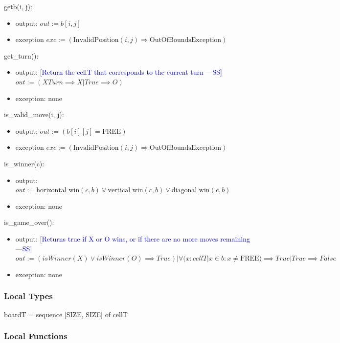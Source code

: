 \documentclass[12pt,fleqn]{examtst}
\newcommand{\authornote}[3]{\textcolor{#1}{[#3 ---#2]}}
\newcommand{\authornote}[3]{}
\newcommand{\wss}[1]{\authornote{blue}{SS}{#1}}
\begin{document}
\noindent getb(i, j):
\begin{itemize}
\item output: $\mathit{out} := b[i, j]$
\item exception
$exc := (\mbox{InvalidPosition}(i, j) \Rightarrow \mbox{OutOfBoundsException})$
\end{itemize}

\noindent get\_turn():
\begin{itemize}
\item output: \wss{Return the cellT that corresponds to the current turn}\\
$out := (XTurn \implies X | True \implies O)$

\item exception: none
\end{itemize}

\noindent is\_valid\_move(i, j):
\begin{itemize}
\item output: $\mathit{out} := (b[i][j] = \mbox{FREE})$ 
\item exception $exc := (\mbox{InvalidPosition}(i, j) \Rightarrow \mbox{OutOfBoundsException})$
\end{itemize}

\noindent is\_winner(c):
\begin{itemize}
\item output: $\mathit{out} := \mbox{horizontal\_win}(c, b) \vee \mbox{vertical\_win}(c, b) \vee
\mbox{diagonal\_win}(c, b)$ 
\item exception: none
\end{itemize}

\noindent is\_game\_over():
\begin{itemize}
\item output: \wss{Returns true if X or O wins, or if there are no more moves remaining}\\
$out := (isWinner(X) \lor isWinner(O)\implies True) | \forall(x : cellT | x \in b : x \neq \mbox{FREE}) \implies True | True \implies False$

\item exception: none
\end{itemize}

\subsubsection* {Local Types}

boardT = sequence [SIZE, SIZE] of cellT

\subsubsection* {Local Functions}
\end{document}
